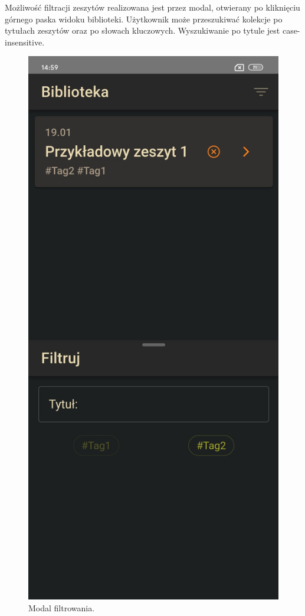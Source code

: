 Możliwość filtracji zeszytów realizowana jest przez modal, otwierany po kliknięciu górnego paska widoku biblioteki.
Użytkownik może przeszukiwać kolekcje po tytułach zeszytów oraz po słowach kluczowych.
Wyszukiwanie po tytule jest case-insensitive.
\begin{figure}[H]
	\begin{center}
		\includegraphics[scale=0.2]{media/FilterModal.jpg}
	\end{center}
	\caption{Modal filtrowania.}
	\label{rys:filter-modal}
\end{figure}

